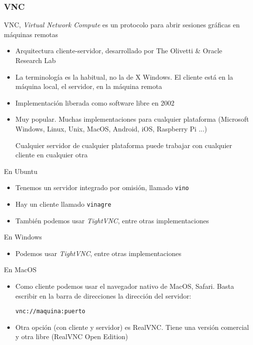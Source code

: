 \documentclass[ucs]{beamer}
\begin{document}
\begin{frame}[fragile]
\frametitle{VNC}
VNC, \emph{Virtual Network Compute}
es un protocolo para abrir sesiones gráficas en máquinas remotas


\begin{itemize}
\item
Arquitectura cliente-servidor, desarrollado por The Olivetti \& Oracle Research Lab
\item
La terminología es la habitual, no la de X Windows. El cliente está en la máquina local, el servidor,
en la máquina remota
\item
Implementación liberada como software libre en 2002
\item
Muy popular. Muchas implementaciones para cualquier plataforma
(Microsoft Windows, Linux, Unix, MacOS, Android, iOS, Raspberry Pi ...)

Cualquier servidor de cualquier plataforma puede trabajar con cualquier
cliente en cualquier otra

\end{itemize}

\end{frame}
\begin{frame}[fragile]


En Ubuntu


\begin{itemize}
\item
Tenemos un servidor integrado por omisión, llamado \verb|vino|
\item
Hay un cliente llamado \verb|vinagre|

\item
También podemos usar 
\emph{TightVNC}, entre otras implementaciones

\end{itemize}


En Windows

\begin{itemize}
\item
Podemos usar 
\emph{TightVNC}, entre otras implementaciones
\end{itemize}


En MacOS

\begin{itemize}
\item
Como cliente podemos usar el navegador nativo de MacOS, Safari. Basta escribir en
la barra de direcciones la dirección del servidor:

\verb|vnc://maquina:puerto|

\item
Otra opción (con cliente y servidor) es RealVNC. Tiene una versión comercial
y otra libre (RealVNC Open Edition)

\end{itemize}


\end{frame}
\end{document}

